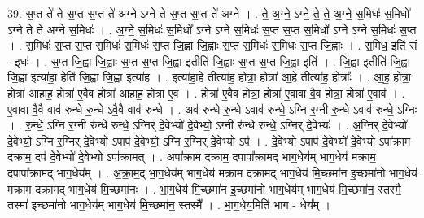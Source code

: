 \documentclass[17pt]{extarticle}
\begin{document}
39. स॒प्त ते॑ ते स॒प्त स॒प्त ते॑ अग्ने ऽग्ने ते स॒प्त स॒प्त ते॑ अग्ने । . ते॒ अ॒ग्ने॒ ऽग्ने॒ ते॒ ते॒ अ॒ग्ने॒ स॒मिधः॑ स॒मिधो᳚ ऽग्ने ते ते अग्ने स॒मिधः॑ । . अ॒ग्ने॒ स॒मिधः॑ स॒मिधो᳚ ऽग्ने ऽग्ने स॒मिधः॑ स॒प्त स॒प्त स॒मिधो᳚ ऽग्ने ऽग्ने स॒मिधः॑ स॒प्त । . स॒मिधः॑ स॒प्त स॒प्त स॒मिधः॑ स॒मिधः॑ स॒प्त जि॒ह्वा जि॒ह्वाः स॒प्त स॒मिधः॑ स॒मिधः॑ स॒प्त जि॒ह्वाः । . स॒मिध॒ इति॑ सं - इधः॑ । . स॒प्त जि॒ह्वा जि॒ह्वाः स॒प्त स॒प्त जि॒ह्वा इतीति॑ जि॒ह्वाः स॒प्त स॒प्त जि॒ह्वा इति॑ । . जि॒ह्वा इतीति॑ जि॒ह्वा जि॒ह्वा इत्या॑हा॒ हेति॑ जि॒ह्वा जि॒ह्वा इत्या॑ह । . इत्या॑हा॒हे तीत्या॑ह॒ होत्रा॒ होत्रा॑ आ॒हे तीत्या॑ह॒ होत्राः᳚ । . आ॒ह॒ होत्रा॒ होत्रा॑ आहाह॒ होत्रा॑ ए॒वैव होत्रा॑ आहाह॒ होत्रा॑ ए॒व । . होत्रा॑ ए॒वैव होत्रा॒ होत्रा॑ ए॒वावा वै॒व होत्रा॒ होत्रा॑ ए॒वाव॑ । . ए॒वावा वै॒वै वाव॑ रुन्धे रु॒न्धे ऽवै॒वै वाव॑ रुन्धे । . अव॑ रुन्धे रु॒न्धे ऽवाव॑ रुन्धे॒ ऽग्नि र॒ग्नी रु॒न्धे ऽवाव॑ रुन्धे॒ ऽग्निः । . रु॒न्धे॒ ऽग्नि र॒ग्नी रु॑न्धे रुन्धे॒ ऽग्निर् दे॒वेभ्यो॑ दे॒वेभ्यो॒ ऽग्नी रु॑न्धे रुन्धे॒ ऽग्निर् दे॒वेभ्यः॑ । . अ॒ग्निर् दे॒वेभ्यो॑ दे॒वेभ्यो॒ ऽग्नि र॒ग्निर् दे॒वेभ्यो ऽपाप॑ दे॒वेभ्यो॒ ऽग्नि र॒ग्निर् दे॒वेभ्यो ऽप॑ । . दे॒वेभ्यो ऽपाप॑ दे॒वेभ्यो॑ दे॒वेभ्यो ऽपा᳚क्राम दक्राम॒ दप॑ दे॒वेभ्यो॑ दे॒वेभ्यो ऽपा᳚क्रामत् । . अपा᳚क्राम दक्राम॒ दपापा᳚क्रामद् भाग॒धेय॑म् भाग॒धेय॑ मक्राम॒ दपापा᳚क्रामद् भाग॒धेय᳚म् । . अ॒क्रा॒म॒द् भा॒ग॒धेय॑म् भाग॒धेय॑ मक्राम दक्रामद् भाग॒धेय॑ मि॒च्छमा॑न इ॒च्छमा॑नो भाग॒धेय॑ मक्राम दक्रामद् भाग॒धेय॑ मि॒च्छमा॑नः । . भा॒ग॒धेय॑ मि॒च्छमा॑न इ॒च्छमा॑नो भाग॒धेय॑म् भाग॒धेय॑ मि॒च्छमा॑न॒ स्तस्मै॒ तस्मा॑ इ॒च्छमा॑नो भाग॒धेय॑म् भाग॒धेय॑ मि॒च्छमा॑न॒ स्तस्मै᳚ । . भा॒ग॒धेय॒मिति॑ भाग - धेय᳚म् । \newline
\pagebreak
{}
\end{document}
